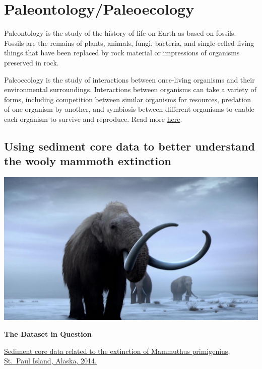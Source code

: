 \documentclass[]{book}
\begin{document}
\hypertarget{paleo}{%
\chapter*{Paleontology/Paleoecology}\label{paleo}}

Paleontology is the study of the history of life on Earth as based on fossils. Fossils are the remains of plants, animals, fungi, bacteria, and single-celled living things that have been replaced by rock material or impressions of organisms preserved in rock.

Paleoecology is the study of interactions between once-living organisms and their environmental surroundings. Interactions between organisms can take a variety of forms, including competition between similar organisms for resources, predation of one organism by another, and symbiosis between different organisms to enable each organism to survive and reproduce. Read more \href{https://www.digitalatlasofancientlife.org/learn/paleoecology/}{here}.

\hypertarget{my-section}{%
\section*{Using sediment core data to better understand the wooly mammoth extinction}\label{my-section}}

\includegraphics{images/mammoths.png}

\textbf{The Dataset in Question}

\href{https://arcticdata.io/catalog/view/doi\%3A10.18739\%2FA24746R6K}{Sediment core data related to the extinction of Mammuthus primigenius, St.~Paul Island, Alaska, 2014.}
\end{document}
